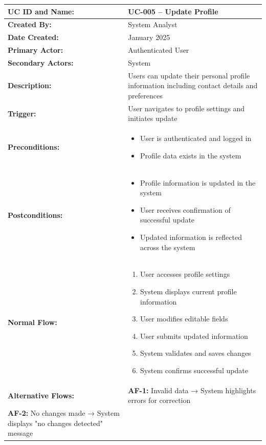 \documentclass[12pt,a4paper]{article}
\begin{document}
\renewcommand{\arraystretch}{1.5}
\begin{longtable}{|p{4.5cm}|p{10.5cm}|}
\hline
\textbf{UC ID and Name:} & UC-005 – Update Profile \\
\hline
\textbf{Created By:} & System Analyst \\
\hline
\textbf{Date Created:} & January 2025 \\
\hline
\textbf{Primary Actor:} & Authenticated User \\
\hline
\textbf{Secondary Actors:} & System \\
\hline
\textbf{Description:} & Users can update their personal profile information including contact details and preferences \\
\hline
\textbf{Trigger:} & User navigates to profile settings and initiates update \\
\hline
\textbf{Preconditions:} &
\begin{itemize}
  \item User is authenticated and logged in
  \item Profile data exists in the system
\end{itemize} \\
\hline
\textbf{Postconditions:} &
\begin{itemize}
  \item Profile information is updated in the system
  \item User receives confirmation of successful update
  \item Updated information is reflected across the system
\end{itemize} \\
\hline
\textbf{Normal Flow:} &
\begin{enumerate}
  \item User accesses profile settings
  \item System displays current profile information
  \item User modifies editable fields
  \item User submits updated information
  \item System validates and saves changes
  \item System confirms successful update
\end{enumerate} \\
\hline
\textbf{Alternative Flows:} &
\textbf{AF-1:} Invalid data → System highlights errors for correction \\
\textbf{AF-2:} No changes made → System displays "no changes detected" message \\

\end{longtable}
\end{document}
